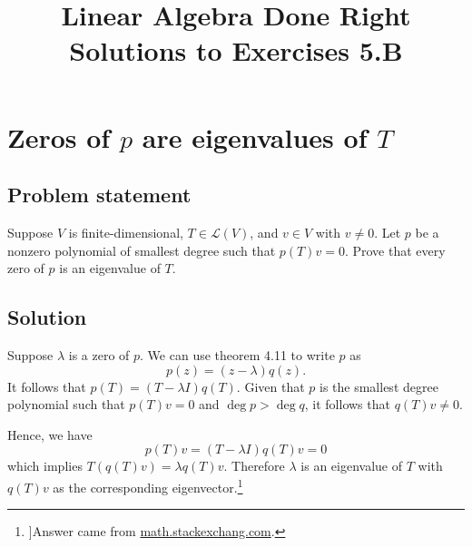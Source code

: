 \documentclass{article}
\title{Linear Algebra Done Right\\Solutions to Exercises 5.B}
\author{}
\date{}
\begin{document}
\maketitle

\renewcommand{\thesection}{9}
\section{Zeros of $p$ are eigenvalues of $T$}
\subsection*{Problem statement}
Suppose $V$ is finite-dimensional, $T\in \mathcal{L}(V)$, and $v\in V$ with $v\neq 0$. 
Let $p$ be a nonzero polynomial of smallest degree such that $p(T)v=0$. 
Prove that every zero of $p$ is an eigenvalue of $T$.

\subsection*{Solution}
Suppose $\lambda$ is a zero of $p$. 
We can use theorem 4.11 to write $p$ as 
\[p(z)=(z-\lambda)q(z).\] 
It follows that $p(T)=(T-\lambda I)q(T)$. 
Given that $p$ is the smallest degree polynomial such that $p(T)v=0$ and $\operatorname{deg}p>\operatorname{deg}q$, it follows that $q(T)v\neq 0$. 

Hence, we have
\[p(T)v=(T-\lambda I)q(T)v=0\]
which implies $T(q(T)v)=\lambda q(T)v$. 
Therefore $\lambda$ is an eigenvalue of $T$ with $q(T)v$ as the corresponding eigenvector.\footnote{
]Answer came from \href{https://math.stackexchange.com/questions/4695496/linear-algebra-done-right-exercise-5-b-9-solution-verification}{math.stackexchang.com}.
}
\end{document}
